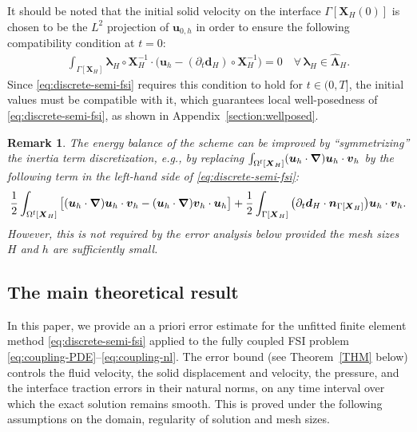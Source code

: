 \documentclass[11pt,reqno]{amsart}
\theoremstyle{definition}
\theoremstyle{plain}
\newtheorem{remark}{Remark}[section]
\numberwithin{theorem}{section}
\numberwithin{proposition}{section}
\numberwithin{lemma}{section}
\numberwithin{equation}{section}
\newcommand{\bs}[1]{\boldsymbol{#1}}
\newcommand{\uu}[1]  {{\bs{#1}} }
\newcommand{\grad}   { \uu{\nabla}    }
\newcommand{\bu}{\uu{u}}
\renewcommand{\(}{\bigl(}
\renewcommand{\)}{\bigr)}
\begin{document}
It should be noted  that the initial solid velocity on the interface $\Gamma[{\bs X}_H(0)]$ is chosen to be the $L^2$ projection of ${\bs u}_{0,h}$ in order to ensure the following compatibility condition at $t=0$:
\begin{align}\label{initial-constraint}
\int_{\Gamma[\bs X_H]} {\bs\lambda}_H \circ {\bs X}_H^{-1} \cdot \big( \bu_h - (\partial_t{\bs d}_H) \circ {\bs X}_H^{-1}\big) = 0
\quad\forall\, {\bs\lambda}_H \in \widehat{\bs\Lambda}_H.
\end{align}
Since \eqref{eq:discrete-semi-fsi} requires this condition to hold for $t \in (0,T]$, the initial values must be compatible with it, which guarantees local well-posedness of \eqref{eq:discrete-semi-fsi}, as shown in Appendix~\ref{section:wellposed}.

\begin{remark}\upshape\upshape 
The energy balance of the scheme can be improved by ``symmetrizing'' the inertia term discretization, e.g., by replacing $\int_{\Omega^{\rm f}[\bs X_H]}   (\bs u_h \cdot \grad) \bu_h \cdot {\bs v}_h $ by the following term in the left-hand side of \eqref{eq:discrete-semi-fsi}:  
$$
\frac12 \int_{\Omega^{\rm f}[\bs X_H]}
\big[({\bs u}_h\cdot\grad) {\bs u}_h \cdot {\bs v}_h 
- ({\bs u}_h\cdot\grad) {\bs v}_h \cdot {\bs u}_h\big] 
+ \frac12 \int_{\Gamma[\bs X_H]} \big(\partial_t{\bs d}_H\cdot{\bs n}_{\Gamma[\bs X_H]}\big) {\bs u}_h \cdot {\bs v}_h . 
$$
However, this is not required by the error analysis below provided the mesh sizes $H$ and $h$ are sufficiently small. 
\end{remark}

\subsection{The main theoretical result}


In this paper, we provide an 
a priori error estimate for the unfitted finite element method
\eqref{eq:discrete-semi-fsi} applied to the fully coupled FSI problem \eqref{eq:coupling-PDE}–\eqref{eq:coupling-nl}. The error bound (see Theorem~\ref{THM} below) controls the
fluid velocity, the solid displacement and velocity, the pressure, and the
interface traction errors in their natural norms, on any time interval over which the
exact solution remains smooth.
 This is proved under the following assumptions on the domain, regularity of solution and mesh sizes.
\medskip
\end{document}
